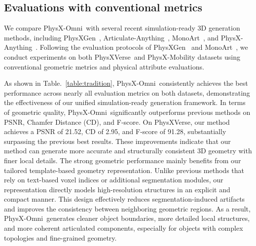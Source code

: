 \documentclass[11pt]{article}
\def\ourname{PhysX-Omni}
\def\ournewdata{PhysXVerse}
\begin{document}
  

\subsection{Evaluations with conventional metrics}

We compare \ourname\ with several recent simulation-ready 3D generation methods, including PhysXGen~\cite{cao2025physx}, Articulate-Anything~\cite{le2024articulate}, MonoArt~\cite{li2026monoart}, and PhysX-Anything~\cite{cao2025physxanything}. Following the evaluation protocols of PhysXGen~\cite{cao2025physx} and MonoArt~\cite{li2026monoart}, we conduct experiments on both \ournewdata\ and PhysX-Mobility datasets using conventional geometric metrics and physical attribute evaluations.

As shown in Table.~\ref{table:tradition}, \ourname\ consistently achieves the best performance across nearly all evaluation metrics on both datasets, demonstrating the effectiveness of our unified simulation-ready generation framework. In terms of geometric quality, \ourname\ significantly outperforms previous methods on PSNR, Chamfer Distance (CD), and F-score. On \ournewdata, our method achieves a PSNR of 21.52, CD of 2.95, and F-score of 91.28, substantially surpassing the previous best results. These improvements indicate that our method can generate more accurate and structurally consistent 3D geometry with finer local details. The strong geometric performance mainly benefits from our tailored template-based geometry representation. Unlike previous methods that rely on text-based voxel indices or additional segmentation modules, our representation directly models high-resolution structures in an explicit and compact manner. This design effectively reduces segmentation-induced artifacts and improves the consistency between neighboring geometric regions. As a result, \ourname\ generates cleaner object boundaries, more detailed local structures, and more coherent articulated components, especially for objects with complex topologies and fine-grained geometry.
\end{document}

